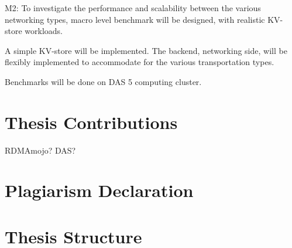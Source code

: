 M2: To investigate the performance and scalability between the various networking types, macro level benchmark will be designed, with realistic KV-store workloads.

A simple KV-store will be implemented.
The backend, networking side, will be flexibly implemented to accommodate for the various transportation types.
 
Benchmarks will be done on DAS 5 computing cluster.

\section{Thesis Contributions}
RDMAmojo?
DAS?

\section{Plagiarism Declaration}

\section{Thesis Structure}